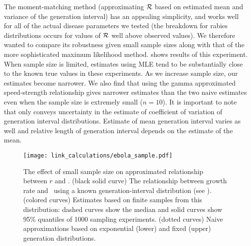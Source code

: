 The moment-matching method (approximating ${\cal R}$ based on estimated mean and variance of the generation interval) has an appealing simplicity, and works well for all of the actual disease parameters we tested (the breakdown for rabies distributions occurs for values of ${\cal R}$ well above observed values). We therefore wanted to compare its robustness given small sample sizes along with that of the more sophisticated maximum likelihood method.  shows results of this experiment. When sample size is limited, estimates using MLE tend to be substantially close to the known true values in these experiments. 
As we increase sample size, our estimates become narrower. 
We also find that using the gamma approximated speed-strength relationship gives narrower estimates than the two naive estimates even when the sample size is extremely small ($n = 10$).
It is important to note that  only conveys uncertainty in the estimate of coefficient of variation of generation interval distributions.
Estimate of mean generation interval varies as well and relative length of generation interval depends on the estimate of the mean.

\begin{figure}[htbp] \centering
	\texttt{[image: link\_calculations/ebola\_sample.pdf]}
\caption{
%
The effect of small sample size on approximated relationship between $r$ and \RR.
(black solid curve) The relationship between growth rate and \RR~using a known generation-interval distribution (see ).
(colored curves) Estimates based on finite samples from this distribution: dashed curves show the median and solid curves show 95\% quantiles of 1000 sampling experiments.
(dotted curves) Naive approximations based on exponential (lower) and fixed (upper) generation distributions.
%
}
	\label{fig:ebolaSample}
\end{figure}




